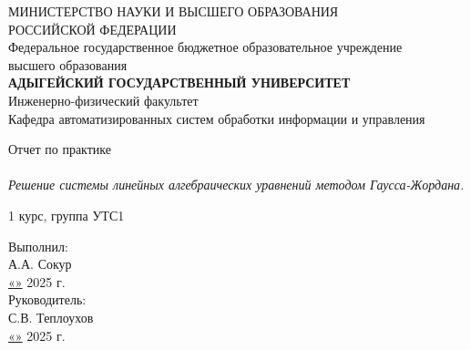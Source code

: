 \documentclass[a4paper,12pt]{article}
\newcommand{\centered}[1]{\begin{center}#1\end{center}}
\begin{document}
\thispagestyle{empty} %

\centered{
{МИНИСТЕРСТВО НАУКИ И ВЫСШЕГО ОБРАЗОВАНИЯ \\
РОССИЙСКОЙ ФЕДЕРАЦИИ} \\[0cm]

Федеральное государственное бюджетное образовательное учреждение \\
высшего образования \\[0cm]

\textbf{АДЫГЕЙСКИЙ ГОСУДАРСТВЕННЫЙ УНИВЕРСИТЕТ} \\[0.3cm]

Инженерно-физический факультет \\
Кафедра автоматизированных систем обработки информации и управления
}

\vspace*{3cm}

\begin{center}
{Отчет по практике} \\[0.5cm]
\fontsize{20}{24}\selectfont{Программная реализация численного метода} \\[0cm]
\textit{Решение системы линейных алгебраических уравнений методом Гаусса-Жордана.}
\end{center}
\vspace*{0cm}

\begin{center}
1 курс, группа УТС1
\end{center}

\vspace*{1cm}

\begin{flushright}
\hspace*{2cm} %
Выполнил: \\
\underline{\hspace{4cm}} \quad А.А. Сокур \\
\underline{«\hspace{0.8cm}»} \underline{\hspace{4cm}} 2025 г. \\
Руководитель: \\
\underline{\hspace{3.5cm}} \quad С.В. Теплоухов \\
\underline{«\hspace{0.8cm}»} \underline{\hspace{4cm}} 2025 г.
\end{flushright}
\end{document}
